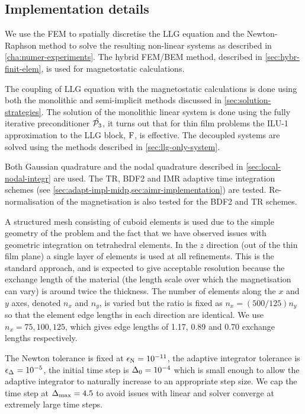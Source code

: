\subsection{Implementation details}

We use the FEM to spatially discretise the LLG equation and the Newton-Raphson method to solve the resulting non-linear systems as described in \cref{cha:numer-experiments}.
The hybrid FEM/BEM method, described in \cref{sec:hybr-finit-elem}, is used for magnetostatic calculations.

The coupling of LLG equation with the magnetostatic calculations is done using both the monolithic and semi-implicit methods discussed in \cref{sec:solution-strategies}.
The solution of the monolithic linear system is done using the fully iterative preconditioner $\hat{\mathcal{P}_3}$, it turns out that for thin film problems the ILU-1 approximation to the LLG block, $\mathrm{F}$, is effective.
The decoupled systems are solved using the methods described in \cref{sec:llg-only-system}.

Both Gaussian quadrature and the nodal quadrature described in \cref{sec:local-nodal-integr} are used.
The TR, BDF2 and IMR adaptive time integration schemes (see \cref{sec:adapt-impl-midp,sec:aimr-implementation}) are tested.
Re-normalisation of the magnetisation is also tested for the BDF2 and TR schemes.


A structured mesh consisting of cuboid elements is used due to the simple geometry of the problem and the fact that we have observed issues with geometric integration on tetrahedral elements.
In the $z$ direction (out of the thin film plane) a single layer of elements is used at all refinements.
This is the standard approach, and is expected to give acceptable resolution because the exchange length of the material (the length scale over which the magnetisation can vary) is around twice the thickness.
The number of elements along the $x$ and $y$ axes, denoted $n_x$ and $n_y$, is varied but the ratio is fixed as $n_x = (500/125) n_y$ so that the element edge lengths in each direction are identical.
We use $n_x=75,100,125$, which gives edge lengths of 1.17, 0.89 and 0.70 exchange lengths respectively.

The Newton tolerance is fixed at $\epsilon_{\mathrm{N}} = 10^{-11}$, the adaptive integrator tolerance is $\epsilon_{\Delta_{}} = 10^{-5}$, the initial time step is $\Delta_{0} = 10^{-4}$ which is small enough to allow the adaptive integrator to naturally increase to an appropriate step size.
We cap the time step at $\Delta_{\text{max}} = 4.5$ to avoid issues with linear and solver converge at extremely large time steps.


